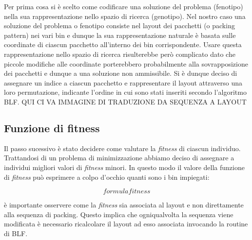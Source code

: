 Per prima cosa si è scelto come codificare una soluzione del problema (fenotipo) nella sua rappresentazione nello spazio di ricerca (genotipo). Nel nostro caso una soluzione del problema o fenotipo consiste nel layout dei pacchetti (o packing pattern) nei vari bin e dunque la sua rappresentazione naturale è basata sulle coordinate di ciascun pacchetto all'interno dei bin corrispondente. Usare questa rappresentazione nello spazio di ricerca risulterebbe però complicato dato che piccole modifiche alle coordinate porterebbero probabilmente alla sovrapposizione dei pacchetti e dunque a una soluzione non ammissibile. Si è dunque deciso di assegnare un indice a ciascun pacchetto e rappresentare il layout attraverso una loro permutazione, indicante l'ordine in cui sono stati inseriti secondo l'algoritmo BLF.
QUI CI VA IMMAGINE DI TRADUZIONE DA SEQUENZA A LAYOUT
\subsection{Funzione di fitness}
Il passo sucessivo è stato decidere come valutare la \emph{fitness} di ciascun individuo. Trattandosi di un problema di minimizzazione abbiamo deciso di assegnare a individui migliori valori di \emph{fitness} minori. In questo modo il valore della funzione di \emph{fitness} può esprimere a colpo d'occhio quanti sono i bin impiegati:

\[
   formula fitness
\]

è importante osservere come la \emph{fitness} sia associata al layout e non direttamente alla sequenza di packing. Questo implica che ogniqualvolta la sequenza viene modificata è necessario ricalcolare il layout ad esso associata invocando la routine di BLF.
